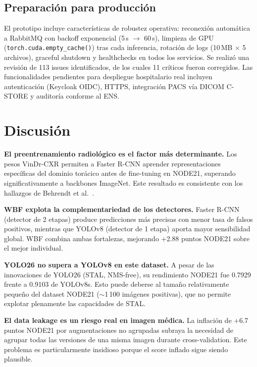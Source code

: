 \documentclass[conference]{IEEEtran}
\begin{document}
\subsection{Preparación para producción}

El prototipo incluye características de robustez operativa: reconexión automática a RabbitMQ con backoff exponencial (5\,s $\rightarrow$ 60\,s), limpieza de GPU (\texttt{torch.cuda.empty\_cache()}) tras cada inferencia, rotación de logs (10\,MB $\times$ 5 archivos), graceful shutdown y healthchecks en todos los servicios. Se realizó una revisión de 113 issues identificados, de los cuales 11 críticos fueron corregidos. Las funcionalidades pendientes para despliegue hospitalario real incluyen autenticación (Keycloak OIDC), HTTPS, integración PACS vía DICOM C-STORE y auditoría conforme al ENS.

\section{Discusión}

\textbf{El preentrenamiento radiológico es el factor más determinante.} Los pesos VinDr-CXR permiten a Faster R-CNN aprender representaciones específicas del dominio torácico antes de fine-tuning en NODE21, superando significativamente a backbones ImageNet. Este resultado es consistente con los hallazgos de Behrendt et al.~\cite{behrendt2023}.

\textbf{WBF explota la complementariedad de los detectores.} Faster R-CNN (detector de 2 etapas) produce predicciones más precisas con menor tasa de falsos positivos, mientras que YOLOv8 (detector de 1 etapa) aporta mayor sensibilidad global. WBF combina ambas fortalezas, mejorando +2.88 puntos NODE21 sobre el mejor individual.

\textbf{YOLO26 no supera a YOLOv8 en este dataset.} A pesar de las innovaciones de YOLO26 (STAL, NMS-free), su rendimiento NODE21 fue 0.7929 frente a 0.9103 de YOLOv8s. Esto puede deberse al tamaño relativamente pequeño del dataset NODE21 ($\sim$1\,100 imágenes positivas), que no permite explotar plenamente las capacidades de STAL.

\textbf{El data leakage es un riesgo real en imagen médica.} La inflación de +6.7 puntos NODE21 por augmentaciones no agrupadas subraya la necesidad de agrupar todas las versiones de una misma imagen durante cross-validation. Este problema es particularmente insidioso porque el score inflado sigue siendo plausible.
\end{document}
